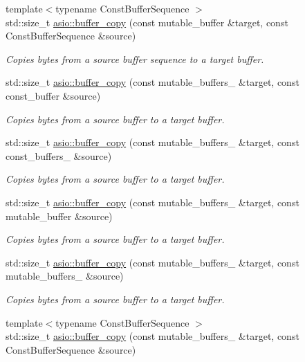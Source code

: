 \begin{DoxyCompactItemize}
{\footnotesize template$<$typename Const\+Buffer\+Sequence $>$ }\\std\+::size\+\_\+t \hyperlink{group__buffer__copy_gae2aab004dd723dc638aeb08552e4c9a9}{asio\+::buffer\+\_\+copy} (const mutable\+\_\+buffer \&target, const Const\+Buffer\+Sequence \&source)
\begin{DoxyCompactList}\small\item\em Copies bytes from a source buffer sequence to a target buffer. \end{DoxyCompactList}\item 
std\+::size\+\_\+t \hyperlink{group__buffer__copy_ga579f9adb02c3bc0b597f6a7bff4cf18e}{asio\+::buffer\+\_\+copy} (const mutable\+\_\+buffers\+\_ \&target, const const\+\_\+buffer \&source)
\begin{DoxyCompactList}\small\item\em Copies bytes from a source buffer to a target buffer. \end{DoxyCompactList}\item 
std\+::size\+\_\+t \hyperlink{group__buffer__copy_ga12327c4bafb7677e99bb0358bfe22605}{asio\+::buffer\+\_\+copy} (const mutable\+\_\+buffers\+\_ \&target, const const\+\_\+buffers\+\_ \&source)
\begin{DoxyCompactList}\small\item\em Copies bytes from a source buffer to a target buffer. \end{DoxyCompactList}\item 
std\+::size\+\_\+t \hyperlink{group__buffer__copy_gad90d26f875c173b7a76b133f43b42820}{asio\+::buffer\+\_\+copy} (const mutable\+\_\+buffers\+\_ \&target, const mutable\+\_\+buffer \&source)
\begin{DoxyCompactList}\small\item\em Copies bytes from a source buffer to a target buffer. \end{DoxyCompactList}\item 
std\+::size\+\_\+t \hyperlink{group__buffer__copy_gaae1f69957daad37a92d711b3d6f3d474}{asio\+::buffer\+\_\+copy} (const mutable\+\_\+buffers\+\_ \&target, const mutable\+\_\+buffers\+\_ \&source)
\begin{DoxyCompactList}\small\item\em Copies bytes from a source buffer to a target buffer. \end{DoxyCompactList}\item 
{\footnotesize template$<$typename Const\+Buffer\+Sequence $>$ }\\std\+::size\+\_\+t \hyperlink{group__buffer__copy_gaf4a2817b703dafb592312891de669218}{asio\+::buffer\+\_\+copy} (const mutable\+\_\+buffers\+\_ \&target, const Const\+Buffer\+Sequence \&source)

\end{DoxyCompactItemize}
